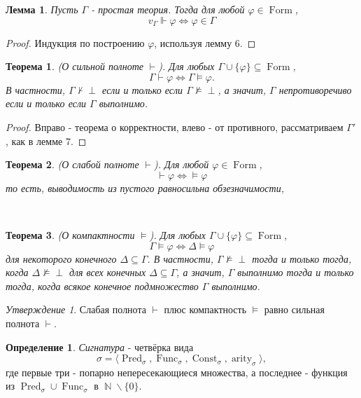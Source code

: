 \documentclass[a4paper,100pt]{article}
\theoremstyle{indented}
\newtheorem{theorem}{Теорема}
\newtheorem{lemma}{Лемма}
\theoremstyle{definition}
\newtheorem{defn}{Определение}
\theoremstyle{remark}
\newtheorem{stat}{Утверждение}
\DeclareMathOperator{\Llra}{\Longleftrightarrow}
\DeclareMathOperator{\NN}{\mathbb{N}}
\DeclareMathOperator{\form}{Form}
\DeclareMathOperator{\Pred}{Pred}
\DeclareMathOperator{\Func}{Func}
\DeclareMathOperator{\Const}{Const}
\DeclareMathOperator{\arity}{arity}
\begin{document}
\begin{lemma}
  Пусть $\Gamma$ - простая теория. Тогда для любой $\varphi \in \form$, 
  \[
    v_\Gamma \Vdash \varphi \Longleftrightarrow \varphi \in \Gamma
  \]
\end{lemma}

\begin{proof}
  Индукция по построению $\varphi$, используя лемму 6.
\end{proof}

\begin{theorem}
  (О сильной полноте $\vdash$). Для любых $\Gamma\cup \{\varphi\}\subseteq \form$, 
  \[
    \Gamma \vdash \varphi \Llra \Gamma \vDash \varphi. 
  \]
  В частности, $\Gamma \nvdash \perp$ если и только если $\Gamma \nvDash \perp$, а значит, $\Gamma$ непротиворечиво если и только если $\Gamma$ выполнимо.
\end{theorem}

\begin{proof}
  Вправо - теорема о корректности, влево - от противного, рассматриваем $\Gamma'$, как в лемме 7.
\end{proof}

\begin{theorem}
  (О слабой полноте $\vdash$). Для любой $\varphi \in \form$, 
  \[
    \vdash \varphi \Llra \vDash \varphi
  \]
  то есть, выводимость из пустого равносильна обзезначимости,
\end{theorem}\ 

\begin{theorem}
  (О компактности $\vDash$). Для любых $\Gamma \cup \{\varphi\}\subseteq \form$, 
  \[
    \Gamma \vDash \varphi \Llra \Delta \vDash \varphi
  \]
  для некоторого конечного $\Delta \subseteq \Gamma$. В частности, $\Gamma \nvDash \perp$ тогда и только тогда, когда $\Delta \nvDash \perp$ для всех конечных $\Delta \subseteq \Gamma$, а значит, $\Gamma$ выполнимо тогда и только тогда, когда всякое конечное подмножество $\Gamma $ выполнимо.
\end{theorem}

\begin{stat}
  Слабая полнота $\vdash$ плюс компактность $\vDash$ равно сильная полнота $\vdash$. 
\end{stat}

\begin{defn}
  \textit{Сигнатура} - четвёрка вида 
  \[
    \sigma = \langle \Pred_\sigma, \Func_\sigma, \Const_\sigma, \arity_\sigma \rangle,
  \]
  где первые три - попарно непересекающиеся множества, а последнее - функция из $\Pred_\sigma \cup \Func_\sigma$ в $\NN\backslash \{0\}$. 
\end{defn}
\end{document}
